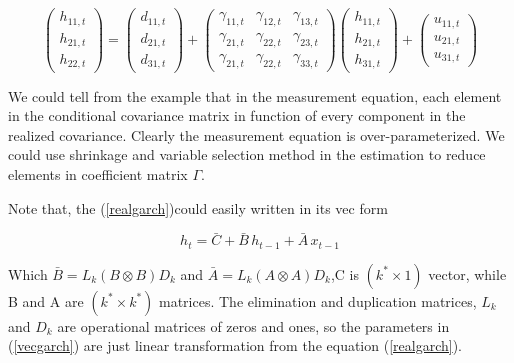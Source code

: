 \documentclass[titlepage,11pt]{article}
\begin{document}
\begin{equation*}
\left(\begin{array}{c}
h_{11,t}  \\
h_{21,t} \\
h_{22,t}\end{array}\right) = 
\left( \begin{array}{c}
d_{11,t}  \\
d_{21,t} \\
d_{31,t}\end{array}\right)
+ \left( \begin{array}{ccc}
\gamma_{11,t} & \gamma_{12,t}  & \gamma_{13,t} \\
\gamma_{21,t} & \gamma_{22,t}  & \gamma_{23,t} \\
\gamma_{21,t} & \gamma_{22,t}  & \gamma_{33,t}
\end{array} \right) 
\left(\begin{array}{c}
h_{11,t} \\
h_{21,t} \\
h_{31,t}
\end{array}\right)
+ \left(\begin{array}{c}
u_{11,t} \\
u_{21,t} \\
u_{31,t}
\end{array} \right)
\end{equation*}

We could tell from the example that in the measurement equation, each element in the conditional covariance matrix in function of every component in the realized covariance. Clearly the measurement equation is over-parameterized. We could use shrinkage and variable selection method in the estimation to reduce elements  in coefficient matrix $\Gamma$.

Note that, the (\ref{realgarch})could easily written in its vec form

\begin{equation}
\label{vecgarch}
 h_t=\bar{C}+ \bar{B} \,  h_{t-1}+\bar{A} \,  x_{t-1}
\end{equation}

Which $\bar{B} = L_k(B\otimes B)D_k$ and $\bar{A} = L_k(A\otimes A)D_k$,C is $(k^* \times 1) $ vector, while B and A are $(k^* \times k^*)$ matrices. The elimination and duplication matrices, $L_k$ and $D_k$ are operational matrices of zeros and ones, so the parameters in (\ref{vecgarch}) are just linear transformation from the equation (\ref{realgarch}). 
\end{document}

